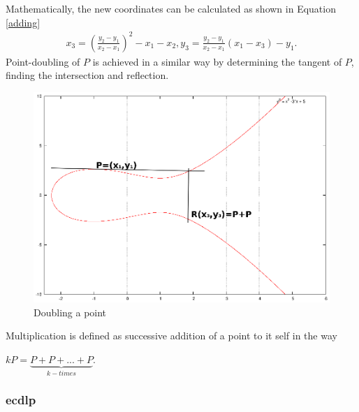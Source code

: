 Mathematically, the new coordinates can be calculated as shown in Equation \ref{adding}
\begin{align}\label{adding}
x_3 = (\frac{y_2-y_1}{x_2-x_1})^2-x_1-x_2, y_3=\frac{y_2-y_1}{x_2-x_1}(x_1-x_3)-y_1.
\end{align}   
Point-doubling of $P$ is achieved in a similar way by determining the tangent of $P$, finding the intersection and reflection.
          \begin{figure}[H]
	    \centering
              \includegraphics[width=0.6\linewidth]{figures/doubleEC.eps}
              \caption{Doubling a point}
              \label{fig:ecDouble}
          \end{figure}
% 
% 
Multiplication is defined as successive addition of a point to it self in the way
\begin{center}
 $kP = \underbrace{P+P+...+P}_{k-times}$.
\end{center}


\subsubsection{\gls{ecdlp}}\label{ecdp}

